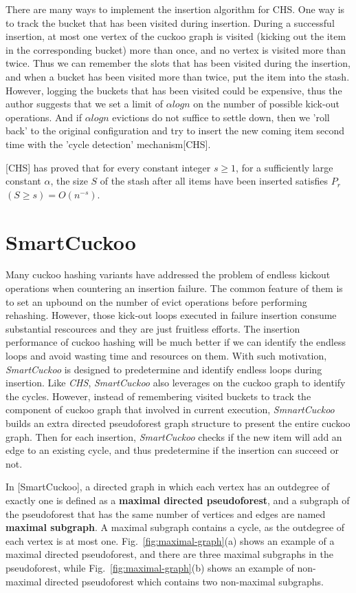 \documentclass[12pt,conference,compsoc]{IEEEtran}
\begin{document}
There are many ways to implement the insertion algorithm for CHS. One way is to track the bucket that has been visited during insertion. During a successful insertion, at most one vertex of the cuckoo graph is visited (kicking out the item in the corresponding bucket) more than once, and no vertex is visited more than twice. Thus we can remember the slots that has been visited during the insertion, and when a bucket has been visited more than twice, put the item into the stash. However, logging the buckets that has been visited could be expensive, thus the author suggests that we set a limit of $\alpha logn$ on the number of possible kick-out operations. And if $\alpha logn$ evictions do not suffice to settle down, then we 'roll back' to the original configuration and try to insert the new coming item second time with the 'cycle detection' mechanism[CHS].

[CHS] has proved that for every constant integer $s\geq 1$, for a sufficiently large constant $\alpha$, the size $S$ of the stash after all items have been inserted satisfies \textbf{$P_r$}$(S\geq s)=O(n^{-s})$.


\section{SmartCuckoo}
\label{sec:smart}
Many cuckoo hashing variants have addressed the problem of endless kickout operations when countering an insertion failure. The common feature of them is to set an upbound on the number of evict operations before performing rehashing. However, those kick-out loops executed in failure insertion consume substantial rescources and they are just fruitless efforts. The insertion performance of cuckoo hashing will be much better if we can identify the endless loops and avoid wasting time and resources on them. With such motivation, \textit{SmartCuckoo} is designed to predetermine and identify endless loops during insertion. Like \textit{CHS}, \textit{SmartCuckoo} also leverages on the cuckoo graph to identify the cycles. However, instead of remembering visited buckets to track the component of cuckoo graph that involved in current execution, \textit{SmnartCuckoo} builds an extra directed pseudoforest graph structure to present the entire cuckoo graph. Then for each insertion, \textit{SmartCuckoo} checks if the new item will add an edge to an existing cycle, and thus predetermine if the insertion can succeed or not.

In [SmartCuckoo], a directed graph in which each vertex has an outdegree of exactly one is defined as a \textbf{maximal directed pseudoforest}, and a subgraph of the pseudoforest that has the same number of vertices and edges are named \textbf{maximal subgraph}. A maximal subgraph contains a cycle, as the outdegree of each vertex is at most one. Fig.~\ref{fig:maximal-graph}(a) shows an example of a maximal directed pseudoforest, and there are three maximal subgraphs in the pseudoforest, while Fig.~\ref{fig:maximal-graph}(b) shows an example of non-maximal directed pseudoforest which contains two non-maximal subgraphs. 
\end{document}
